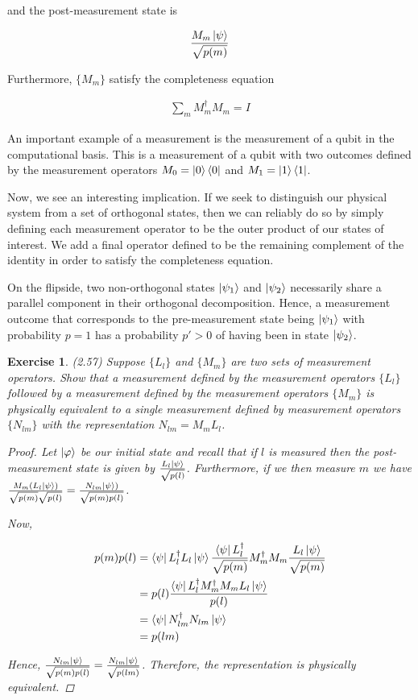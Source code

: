 \documentclass[11pt]{article}
\newcommand\0{\mathbf{0}}
\newcommand\<{\langle}
\renewcommand\>{\rangle}
\renewcommand\phi{\varphi}
\newtheorem{exercise}[theorem]{Exercise}
\begin{document}
and the post-measurement state is 

\begin{align*}
	\frac{M_m \ket{\psi}}{\sqrt{p(m)}}
\end{align*}

Furthermore, $\{ M_m \}$ satisfy the completeness equation

\begin{align*}
\sum_m M_m^\dagger M_m = I
\end{align*}

An important example of a measurement is the measurement of a qubit in the computational basis. This is a measurement of a qubit with two outcomes defined by the measurement operators $M_0 = \ket{0}\bra{0}$ and $M_1 = \ket{1}\bra{1}$.

Now, we see an interesting implication. If we seek to distinguish our physical system from a set of orthogonal states, then we can reliably do so by simply defining each measurement operator to be the outer product of our states of interest. We add a final operator defined to be the remaining complement of the identity in order to satisfy the completeness equation. 

On the flipside, two non-orthogonal states $\ket{\psi_1}$ and $\ket{\psi_2}$ necessarily share a parallel component in their orthogonal decomposition. Hence, a measurement outcome that corresponds to the pre-measurement state being $\ket{\psi_1}$ with probability $p = 1$ has a probability $p'>0$ of having been in state $\ket{\psi_2}$. 

\begin{exercise}
(2.57) Suppose $\{L_l\}$ and $\{M_m\}$ are two sets of measurement operators. Show that a measurement defined by the measurement operators $\{L_l \}$ followed by a measurement defined by the measurement operators $\{ M_m \}$ is physically equivalent to a single measurement defined by measurement operators $\{N_{lm}\}$ with the representation $N_{lm} = M_mL_l$.
\begin{proof}
Let $\ket{\phi}$ be our initial state and recall that if $l$ is measured then the post-measurement state is given by $\frac{L_l \ket{\psi}}{\sqrt{p(l)}}$. Furthermore, if we then measure $m$ we have 	$\frac{M_m(L_l \ket{\psi})}{\sqrt{p(m)}\sqrt{p(l)}} = \frac{N_{lm} \ket{\psi})}{\sqrt{p(m)p(l)}}$. 

Now, 

\begin{align*}
p(m)p(l) &= \bra{\psi} L_l^\dagger L_l \ket{\psi}\frac{\bra{\psi} L_l^\dagger}{\sqrt{p(m)}}M_m^\dag M_m \frac{L_l \ket{\psi}}{\sqrt{p(m)}} \\
&= p(l) \frac{\bra{\psi} L_l^\dagger M_m^\dag M_m L_l \ket{\psi}}{p(l)}\\
&= \bra{\psi} N_{lm}^\dagger N_{lm} \ket{\psi}\\
&= p(lm)
\end{align*}

Hence, $\frac{N_{lm} \ket{\psi}}{\sqrt{p(m)p(l)}}=\frac{N_{lm} \ket{\psi}}{\sqrt{p(lm)}}$. Therefore, the representation is physically equivalent.
\end{proof}

\end{exercise}
\end{document}
